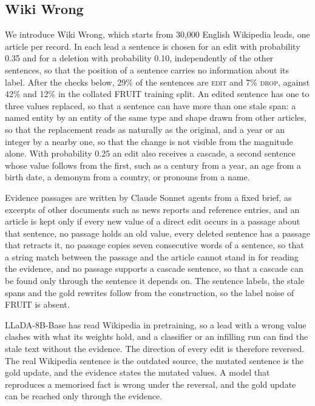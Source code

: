 \documentclass[11pt]{article}
\newcommand{\edit}{\textsc{edit}}
\newcommand{\drop}{\textsc{drop}}
\begin{document}
\subsection{Wiki Wrong}
\label{sec:synthetic}
We introduce Wiki Wrong, which starts from 30,000 English Wikipedia leads, one article per record. In each lead a sentence is chosen for an edit with probability 0.35 and for a deletion with probability 0.10, independently of the other sentences, so that the position of a sentence carries no information about its label. After the checks below, 29\% of the sentences are \edit{} and 7\% \drop{}, against 42\% and 12\% in the collated FRUIT training split. An edited sentence has one to three values replaced, so that a sentence can have more than one stale span: a named entity by an entity of the same type and shape drawn from other articles, so that the replacement reads as naturally as the original, and a year or an integer by a nearby one, so that the change is not visible from the magnitude alone. With probability 0.25 an edit also receives a cascade, a second sentence whose value follows from the first, such as a century from a year, an age from a birth date, a demonym from a country, or pronouns from a name.

Evidence passages are written by Claude Sonnet agents from a fixed brief, as excerpts of other documents such as news reports and reference entries, and an article is kept only if every new value of a direct edit occurs in a passage about that sentence, no passage holds an old value, every deleted sentence has a passage that retracts it, no passage copies seven consecutive words of a sentence, so that a string match between the passage and the article cannot stand in for reading the evidence, and no passage supports a cascade sentence, so that a cascade can be found only through the sentence it depends on. The sentence labels, the stale spans and the gold rewrites follow from the construction, so the label noise of FRUIT is absent.

LLaDA-8B-Base has read Wikipedia in pretraining, so a lead with a wrong value clashes with what its weights hold, and a classifier or an infilling run can find the stale text without the evidence. The direction of every edit is therefore reversed. The real Wikipedia sentence is the outdated source, the mutated sentence is the gold update, and the evidence states the mutated values. A model that reproduces a memorised fact is wrong under the reversal, and the gold update can be reached only through the evidence.
\end{document}
